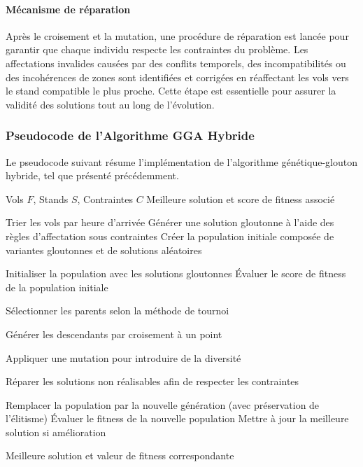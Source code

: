 \paragraph{Mécanisme de réparation}
Après le croisement et la mutation, une procédure de réparation est lancée pour garantir que chaque individu respecte les contraintes du problème. Les affectations invalides causées par des conflits temporels, des incompatibilités ou des incohérences de zones sont identifiées et corrigées en réaffectant les vols vers le stand compatible le plus proche. Cette étape est essentielle pour assurer la validité des solutions tout au long de l’évolution.

\subsubsection*{Pseudocode de l’Algorithme GGA Hybride}

Le pseudocode suivant résume l’implémentation de l’algorithme génétique-glouton hybride, tel que présenté précédemment.

\begin{algorithm}[H]
	\caption{Algorithme Hybride Glouton-Génétique}
	\label{alg:gga_main}
	\begin{algorithmic}[1]
		\Require Vols $F$, Stands $S$, Contraintes $C$
		\Ensure Meilleure solution et score de fitness associé
		
		\State Trier les vols par heure d’arrivée
		\State Générer une solution gloutonne à l’aide des règles d’affectation sous contraintes
		\State Créer la population initiale composée de variantes gloutonnes et de solutions aléatoires
		
		\State Initialiser la population avec les solutions gloutonnes
		\State Évaluer le score de fitness de la population initiale
		
		\State Sélectionner les parents selon la méthode de tournoi
		
		\State Générer les descendants par croisement à un point
		
		\State Appliquer une mutation pour introduire de la diversité
		
		\State Réparer les solutions non réalisables afin de respecter les contraintes
		
		\State Remplacer la population par la nouvelle génération (avec préservation de l’élitisme)
		\State Évaluer le fitness de la nouvelle population
		\State Mettre à jour la meilleure solution si amélioration
		\EndWhile
		
		\Return Meilleure solution et valeur de fitness correspondante
	\end{algorithmic}
\end{algorithm}

